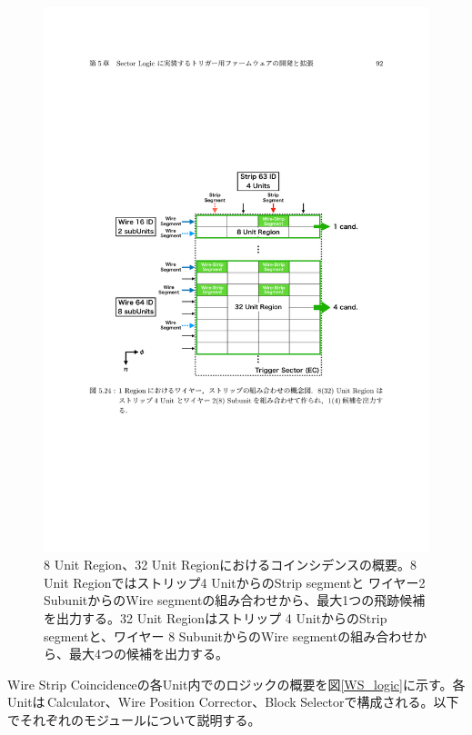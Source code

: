 \begin{figure} 
\centering
\includegraphics[width=16cm]{fig/SL/WS_Concept.pdf}
\caption[]{8 Unit Region、32 Unit Regionにおけるコインシデンスの概要\cite{mt_kawamoto}。8 Unit Regionではストリップ4 UnitからのStrip segmentと ワイヤー2 SubunitからのWire segmentの組み合わせから、最大1つの飛跡候補を出力する。32 Unit Regionはストリップ 4 UnitからのStrip segmentと、ワイヤー 8 SubunitからのWire segmentの組み合わせから、最大4つの候補を出力する。}
\label{WS_Concept}
\end{figure}

Wire Strip Coincidenceの各Unit内でのロジックの概要を図\ref{WS_logic}に示す。各Unitは\pt$\,$Calculator、Wire Position Corrector、Block Selectorで構成される。以下でそれぞれのモジュールについて説明する。

